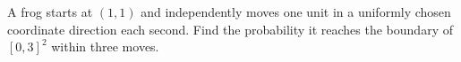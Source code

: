 A frog starts at $(1,1)$ and independently moves one unit in a uniformly chosen coordinate direction each second. Find the probability it reaches the boundary of $[0,3]^2$ within three moves.
